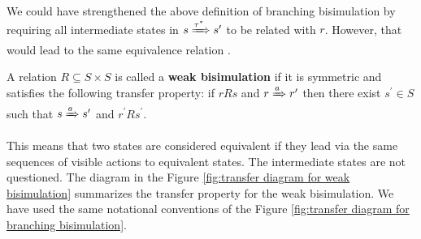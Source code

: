 We could have strengthened the above definition of branching bisimulation by requiring all intermediate states in $s\xRightarrow{\tau^*}s^\prime$ to be related with $r$. However, that would lead to the same equivalence relation \cite{DeNicola95Bisimulations}. 

\begin{definition}
  A relation $R\subseteq S\times S$ is called a {\bf weak bisimulation} if it is symmetric and satisfies the following transfer property: if $rRs$ and $r\xRightarrow{a} r^\prime$ then there exist $s^\prime\in S$ such that $s \xRightarrow{a} s^\prime$ and $r^\prime Rs^{\prime}$.
\end{definition}

This means that two states are considered equivalent if they lead via the same sequences of visible actions to equivalent states. The intermediate states are not questioned. The diagram in the Figure \ref{fig:transfer diagram for weak bisimulation} summarizes the transfer property for the weak bisimulation. We have used the same notational conventions of the Figure \ref{fig:transfer diagram for branching bisimulation}.

\begin{figure}
  \centering
  \begin{minipage}{.4\textwidth}
    \centering
    \label{fig:example run of a labeled transition system}
  \end{minipage}
  \hspace{.08\textwidth}
  \begin{minipage}{.5\textwidth}
    \centering
    \label{fig:example run of a labeled transition system with hidden branching before the first action}
  \end{minipage}
\end{figure}

